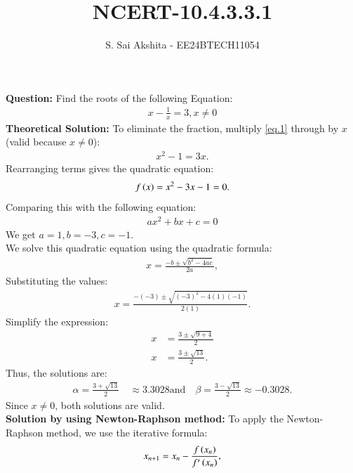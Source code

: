 \documentclass[journal,12pt,onecolumn]{IEEEtran}
\theoremstyle{remark}
\begin{document}

\vspace{3cm}

\title{NCERT-10.4.3.3.1}
\author{S. Sai Akshita - EE24BTECH11054}
\newpage
\maketitle
\bigskip

\renewcommand{\thefigure}{\theenumi}
\renewcommand{\thetable}{\theenumi}
\textbf{Question:} 
Find the roots of the following Equation:
\begin{align}
    x-\frac{1}{x} =3, x\neq 0 \label{eq.1}
\end{align}
\textbf{Theoretical Solution:}
To eliminate the fraction, multiply \ref{eq.1} through by $x$ (valid because $ x \neq 0 $):
\begin{align}
x^2 - 1 = 3x.
\end{align}
Rearranging terms gives the quadratic equation:
\begin{align}
f\left(x\right)=x^2 - 3x - 1 = 0.\label{qe}
\end{align}
Comparing this with the following equation:
\begin{align}
    ax^2+bx+c=0
\end{align}
We get $a=1,b=-3,c=-1$.\\
We solve this quadratic equation using the quadratic formula:
\begin{align}
x = \frac{-b \pm \sqrt{b^2 - 4ac}}{2a},
\end{align}
Substituting the values:
\begin{align}
x = \frac{-(-3) \pm \sqrt{(-3)^2 - 4(1)(-1)}}{2(1)}.
\end{align}
Simplify the expression:
\begin{align}
x &= \frac{3 \pm \sqrt{9 + 4}}{2}\\
x &= \frac{3 \pm \sqrt{13}}{2}.
\end{align}
Thus, the solutions are:
\begin{align}
\alpha = \frac{3 + \sqrt{13}}{2} \quad \approx 3.3028 \text{and} \quad \beta = \frac{3 - \sqrt{13}}{2}\approx -0.3028.
\end{align}
Since $ x \neq 0 $, both solutions are valid.\\
\textbf{Solution by using Newton-Raphson method:}
To apply the Newton-Raphson method, we use the iterative formula:
\begin{align}
	x_{n+1} = x_n - \frac{f\left(x_n\right)}{f^\prime\left(x_n\right)},\label{nrm1}
\end{align}
\end{document}

